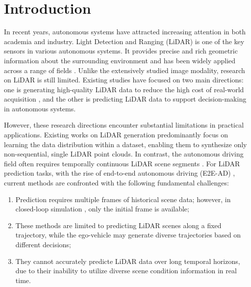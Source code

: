\section{Introduction}
\label{introduction}
In recent years, autonomous systems have attracted increasing attention in both academia and industry. 
Light Detection and Ranging (LiDAR) is one of the key sensors in various autonomous systems. 
It provides precise and rich geometric information about the surrounding environment \cite{li2024di, li2023lwsis, SECOND, cheng2023language, yin2024fusion} and has been widely applied across a range of fields \cite{shi2020pv, shi2019pointrcnn,malavazi2018lidar, weiss2011plant, resop2019drone, zhang2014loam}.
Unlike the extensively studied image modality, research on LiDAR is still limited.
Existing studies have focused on two main directions: one is generating high-quality LiDAR data \cite{LiDARGen2022, xiong2023ultralidar, nakashima2024lidar} to reduce the high cost of real-world acquisition \cite{meng2020weakly, wu2020deep}, and the other is predicting LiDAR data \cite{weng2021inverting, weng2022s2net, khurana2023point} to support decision-making in autonomous systems.

However, these research directions encounter substantial limitations in practical applications.
Existing works on LiDAR generation predominantly focus on learning the data distribution within a dataset, enabling them to synthesize only non-sequential, single LiDAR point clouds. 
In contrast, the autonomous driving field often requires temporally continuous LiDAR scene segments \cite{Geiger2013IJRR, caesar2020nuscenes}.
For LiDAR prediction tasks, with the rise of end-to-end autonomous driving (E2E-AD) \cite{hu2023planning, jiang2023vad, weng2024drive}, current methods are confronted with the following fundamental challenges:
\begin{enumerate}[label=\arabic*), leftmargin=*, align=left]
\item Prediction requires multiple frames of historical scene data; however, in closed-loop simulation \cite{chitta2022transfuser, dosovitskiy2017carla, jia2024bench2drive, prakash2021multi}, only the initial frame is available;
\item These methods are limited to predicting LiDAR scenes along a fixed trajectory, while the ego-vehicle may generate diverse trajectories based on different decisions;
\item They cannot accurately predicte LiDAR data over long temporal horizons, due to their inability to utilize diverse scene condition information in real time.
\end{enumerate} 

